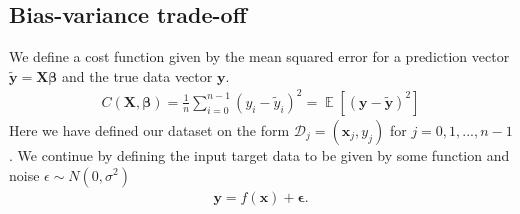\documentclass[11pt]{article}
\DeclareMathOperator*{\E}{\mathbb{E}}
\begin{document}
\subsection*{Bias-variance trade-off}
We define a cost function given by the mean squared error for a prediction vector $\tilde{\boldsymbol{y}}= \boldsymbol{X} \boldsymbol{\beta}$ and the true data vector $\boldsymbol{y}$.
\begin{align*}
    C(\boldsymbol{X}, \boldsymbol{\beta}) = \frac{1 }{n }\sum_ {i=0}^{n-1}(y_i - \tilde{y}_i)^2 = \E[(\boldsymbol{y}- \boldsymbol{\tilde{y}})^2]
\end{align*}
Here we have defined our dataset on the form $\mathcal{D}_j = (\boldsymbol{x}_j, y_j)$ for $j= 0, 1, ..., n-1$.
We continue by defining the input target data to be given by some function and noise $\epsilon\sim N(0, \sigma^2)$
\begin{align*}
    \boldsymbol{y} = f(\boldsymbol{x}) + \boldsymbol{\epsilon}.
\end{align*}
\end{document}
